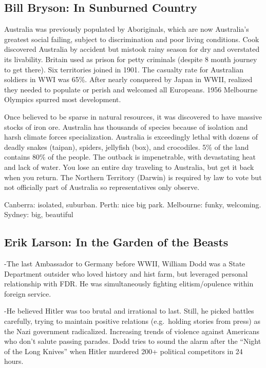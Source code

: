 \documentclass[
]{article}
\begin{document}
\hypertarget{bill-bryson-in-sunburned-country}{%
\subsection{Bill Bryson: In Sunburned
Country}\label{bill-bryson-in-sunburned-country}}

Australia was previously populated by Aboriginals, which are now
Australia's greatest social failing, subject to discrimination and poor
living conditions. Cook discovered Australia by accident but mistook
rainy season for dry and overstated its livability. Britain used as
prison for petty criminals (despite 8 month journey to get there). Six
territories joined in 1901. The casualty rate for Australian soldiers in
WWI was 65\%. After nearly conquered by Japan in WWII, realized they
needed to populate or perish and welcomed all Europeans. 1956 Melbourne
Olympics spurred most development.

Once believed to be sparse in natural resources, it was discovered to
have massive stocks of iron ore. Australia has thousands of species
because of isolation and harsh climate forces specialization. Australia
is exceedingly lethal with dozens of deadly snakes (taipan), spiders,
jellyfish (box), and crocodiles. 5\% of the land contains 80\% of the
people. The outback is impenetrable, with devastating heat and lack of
water. You lose an entire day traveling to Australia, but get it back
when you return. The Northern Territory (Darwin) is required by law to
vote but not officially part of Australia so representatives only
observe.

Canberra: isolated, suburban. Perth: nice big park. Melbourne: funky,
welcoming. Sydney: big, beautiful

\hypertarget{erik-larson-in-the-garden-of-the-beasts}{%
\subsection{Erik Larson: In the Garden of the
Beasts}\label{erik-larson-in-the-garden-of-the-beasts}}

-The last Ambassador to Germany before WWII, William Dodd was a State
Department outsider who loved history and hist farm, but leveraged
personal relationship with FDR. He was simultaneously fighting
elitism/opulence within foreign service.

-He believed Hitler was too brutal and irrational to last. Still, he
picked battles carefully, trying to maintain positive relations
(e.g.~holding stories from press) as the Nazi government radicalized.
Increasing trends of violence against Americans who don't salute passing
parades. Dodd tries to sound the alarm after the ``Night of the Long
Knives'' when Hitler murdered 200+ political competitors in 24 hours.
\end{document}

